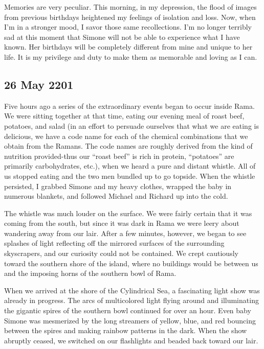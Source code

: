 \documentclass[]{article}
\begin{document}
Memories are very peculiar. This morning, in my depression, the flood of images from previous birthdays heightened my feelings of isolation and loss. Now, when I’m in a stronger mood, I savor those same recollections. I’m no longer terribly sad at this moment that Simone will not be able to experience what I have known. Her birthdays will be completely different from mine and unique to her life. It is my privilege and duty to make them as memorable and loving as I can.

\subsection{26 May 2201}

Five hours ago a series of the extraordinary events began to occur inside Rama. We were sitting together at that time, eating our evening meal of roast beef, potatoes, and salad (in an effort to persuade ourselves that what we are eating is delicious, we have a code name for each of the chemical combinations that we obtain from the Ramans. The code names are roughly derived from the kind of nutrition provided-thus our “roast beef” is rich in protein, “potatoes” are primarily carbohydrates, etc.), when we heard a pure and distant whistle. All of us stopped eating and the two men bundled up to go topside. When the whistle persisted, I grabbed Simone and my heavy clothes, wrapped the baby in numerous blankets, and followed Michael and Richard up into the cold.

The whistle was much louder on the surface. We were fairly certain that it was coming from the south, but since it was dark in Rama we were leery about wandering away from our lair. After a few minutes, however, we began to see splashes of light reflecting off the mirrored surfaces of the surrounding skyscrapers, and our curiosity could not be contained. We crept cautiously toward the southern shore of the island, where no buildings would be between us and the imposing horns of the southern bowl of Rama.

When we arrived at the shore of the Cylindrical Sea, a fascinating light show was already in progress. The arcs of multicolored light flying around and illuminating the gigantic spires of the southern bowl continued for over an hour. Even baby Simone was mesmerized by the long streamers of yellow, blue, and red bouncing between the spires and making rainbow patterns in the dark. When the show abruptly ceased, we switched on our flashlights and beaded back toward our lair.
\end{document}
